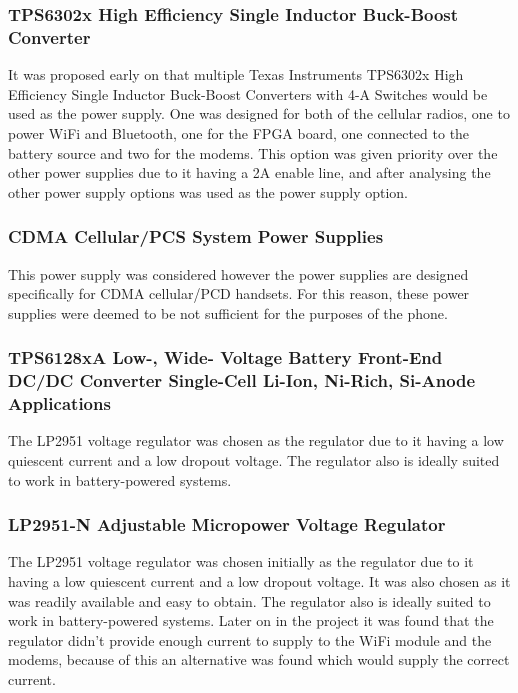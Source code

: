 \subsubsection{TPS6302x High Efficiency Single Inductor Buck-Boost Converter}

It was proposed early on that multiple Texas Instruments TPS6302x High Efficiency Single Inductor Buck-Boost Converters with 4-A Switches would be used as the power supply. 
One was designed for both of the cellular radios, one to power WiFi and Bluetooth, one for the FPGA board, one connected to the battery source and two for the modems. 
This option was given priority over the other power supplies due to it having a 2A enable line, and after analysing the other power supply options was used as the power supply option. 


\subsubsection{CDMA Cellular/PCS System Power Supplies}

This power supply was considered however the power supplies are designed specifically for CDMA cellular/PCD handsets. For this reason, these power supplies were deemed to be not sufficient for the purposes of the phone. 

\subsubsection{TPS6128xA Low-, Wide- Voltage Battery Front-End DC/DC Converter Single-Cell Li-Ion, Ni-Rich, Si-Anode Applications}

The LP2951 voltage regulator was chosen as the regulator due to it having a low quiescent current and a low dropout voltage. The regulator also is ideally suited to work in battery-powered systems. 

\subsubsection{LP2951-N Adjustable Micropower Voltage Regulator}

The LP2951 voltage regulator was chosen initially as the regulator due to it having a low quiescent current and a low dropout voltage. 
It was also chosen as it was readily available and easy to obtain. 
The regulator also is ideally suited to work in battery-powered systems. 
Later on in the project it was found that the regulator didn't provide enough current to supply to the WiFi module and the modems, because of this an alternative was found which would supply the correct current.


